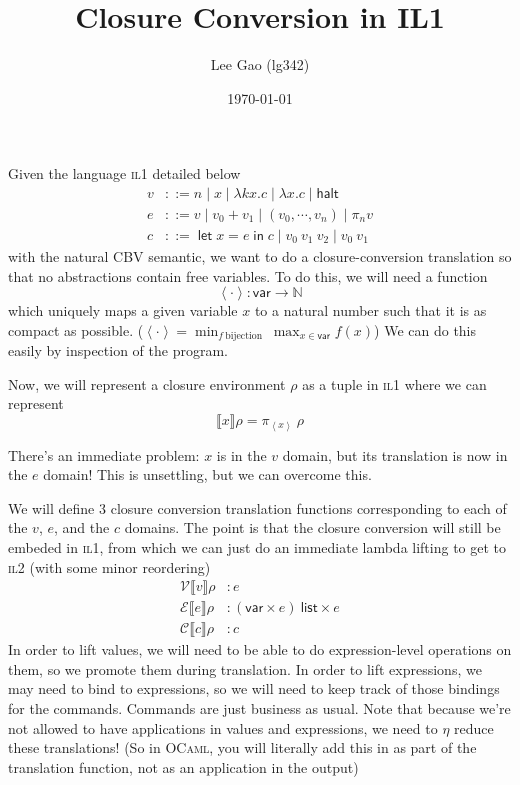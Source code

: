\documentclass[11pt,a4paper]{article}
\author{Lee Gao (lg342)}
\title{Closure Conversion in IL1}
\date{\today}
\newcommand {\coo} [1] {\ensuremath{\operatorname{\mathsf{#1}}}}
\newcommand{\Let}[1]{\coo{let} #1 \coo{in} }
\newcommand{\ba}[1]{\left\langle #1\right\rangle}
\newcommand{\f}[1]{\textsc{#1}}
\newcommand{\g}[1]{\textsf{#1}}
\newcommand{\trans}[2]{\ensuremath{\mathcal{#1}\llbracket #2\rrbracket}}
\begin{document}
\maketitle
\setlength{\parindent}{0pt}

Given the language \f{il1} detailed below
\begin{align*}
v &::= n \mid x \mid \lambda kx.c \mid \lambda x.c \mid \g{halt} \\
e &::= v \mid v_0 + v_1 \mid (v_0,\cdots, v_n) \mid \pi_n v \\
c &::= \Let{x = e}{c} \mid v_0~v_1~v_2 \mid v_0 ~ v_1
\end{align*}
with the natural CBV semantic, we want to do a closure-conversion translation so that no abstractions contain free variables. To do this, we will need a function
$$
\ba{\cdot} : \g{var} \to \mathbb{N}
$$
which uniquely maps a given variable $x$ to a natural number such that it is as compact as possible. ($\ba{\cdot} = \min_{f~\text{bijection}} ~ \max_{x \in \g{var}} f(x)$) We can do this easily by inspection of the program.

Now, we will represent a closure environment $\rho$ as a tuple in \f{il1} where we can represent
$$
\trans{}{x} \rho = \pi_{\ba{x}} ~ \rho
$$

There's an immediate problem: $x$ is in the $v$ domain, but its translation is now in the $e$ domain! This is unsettling, but we can overcome this.

We will define 3 closure conversion translation functions corresponding to each of the $v$, $e$, and the $c$ domains. The point is that the closure conversion will still be embeded in \f{il1}, from which we can just do an immediate lambda lifting to get to \f{il2} (with some minor reordering)
\begin{align*}
\trans{V}{v}\rho &: e \\
\trans{E}{e}\rho &: (\g{var} \times e) ~ \g{list} \times e \\
\trans{C}{c}\rho &: c
\end{align*}
In order to lift values, we will need to be able to do expression-level operations on them, so we promote them during translation. In order to lift expressions, we may need to bind to expressions, so we will need to keep track of those bindings for the commands. Commands are just business as usual. Note that because we're not allowed to have applications in values and expressions, we need to $\eta$ reduce these translations! (So in \f{OCaml}, you will literally add this in as part of the translation function, not as an application in the output)
\end{document}
